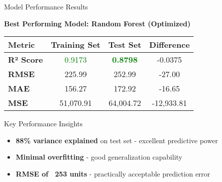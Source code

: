 \documentclass[aspectratio=169]{beamer}
\begin{document}
\begin{frame}{Model Performance Results}
\begin{center}
\textbf{Best Performing Model: Random Forest (Optimized)}
\end{center}

\vspace{0.3cm}
\begin{table}[h]
\centering
\begin{tabular}{@{}lccc@{}}
\toprule
\textbf{Metric} & \textbf{Training Set} & \textbf{Test Set} & \textbf{Difference} \\
\midrule
\textbf{R² Score} & \textcolor{green}{0.9173} & \textcolor{green}{\textbf{0.8798}} & -0.0375 \\
\textbf{RMSE} & 225.99 & 252.99 & -27.00 \\
\textbf{MAE} & 156.27 & 172.92 & -16.65 \\
\textbf{MSE} & 51,070.91 & 64,004.72 & -12,933.81 \\
\bottomrule
\end{tabular}
\end{table}

\vspace{0.5cm}
\begin{alertblock}{Key Performance Insights}
\begin{itemize}
\item \textbf{88\% variance explained} on test set - excellent predictive power
\item \textbf{Minimal overfitting} - good generalization capability
\item \textbf{RMSE of ~253 units} - practically acceptable prediction error
\end{itemize}
\end{alertblock}
\end{frame}
\end{document}
